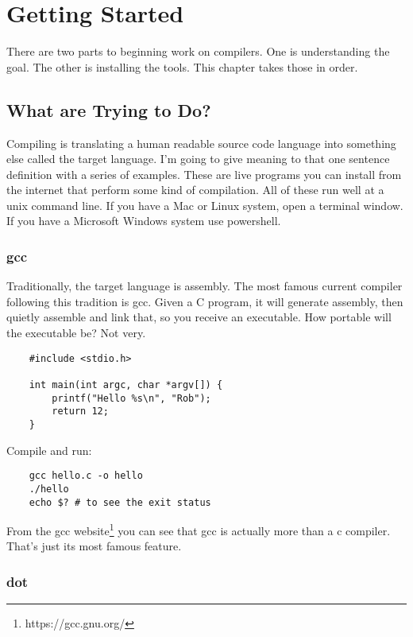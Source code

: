 \chapter{Getting Started}

There are two parts to beginning work on compilers. One is understanding
the goal. The other is installing the tools. This chapter takes those in order.

\section{What are Trying to Do?}

Compiling is translating a human readable source code language
into something else called the target language. I'm going to give
meaning to that one sentence definition with a series of examples.
These are live programs you can install from the internet that
perform some kind of compilation. All of these run well at a
unix command line. If you have a Mac or Linux system, open a terminal
window. If you have a Microsoft Windows system use powershell.

\subsection{gcc}

Traditionally, the target language is assembly. The most famous
current compiler following this tradition is gcc. Given a C program,
it will generate assembly, then quietly assemble and link that, so you
receive an executable. How portable will the executable be? Not very.

{\footnotesize
\begin{verbatim}
    #include <stdio.h>

    int main(int argc, char *argv[]) {
        printf("Hello %s\n", "Rob");
        return 12;
    }
\end{verbatim}
}

Compile and run:

{\footnotesize
\begin{verbatim}
    gcc hello.c -o hello
    ./hello
    echo $? # to see the exit status
\end{verbatim}
}


From the gcc website\footnote{https://gcc.gnu.org/}
you can see that gcc is actually more than a c compiler.
That's just its most famous feature.

\subsection{dot}

